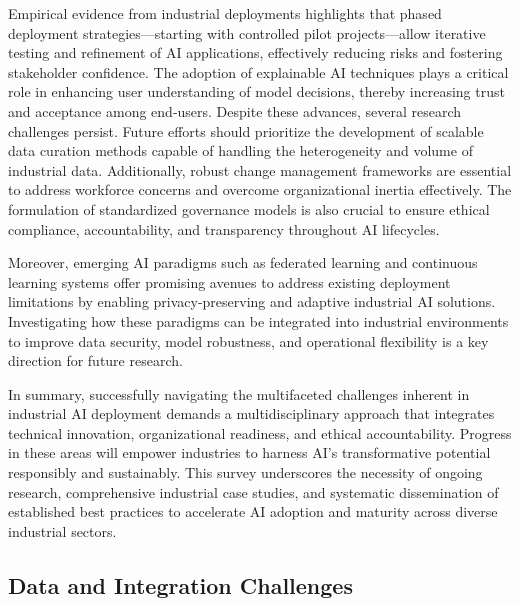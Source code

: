 \documentclass[sigconf]{acmart}
\begin{document}
Empirical evidence from industrial deployments highlights that phased deployment strategies—starting with controlled pilot projects—allow iterative testing and refinement of AI applications, effectively reducing risks and fostering stakeholder confidence. The adoption of explainable AI techniques plays a critical role in enhancing user understanding of model decisions, thereby increasing trust and acceptance among end-users. Despite these advances, several research challenges persist. Future efforts should prioritize the development of scalable data curation methods capable of handling the heterogeneity and volume of industrial data. Additionally, robust change management frameworks are essential to address workforce concerns and overcome organizational inertia effectively. The formulation of standardized governance models is also crucial to ensure ethical compliance, accountability, and transparency throughout AI lifecycles.

Moreover, emerging AI paradigms such as federated learning and continuous learning systems offer promising avenues to address existing deployment limitations by enabling privacy-preserving and adaptive industrial AI solutions. Investigating how these paradigms can be integrated into industrial environments to improve data security, model robustness, and operational flexibility is a key direction for future research.

In summary, successfully navigating the multifaceted challenges inherent in industrial AI deployment demands a multidisciplinary approach that integrates technical innovation, organizational readiness, and ethical accountability. Progress in these areas will empower industries to harness AI's transformative potential responsibly and sustainably. This survey underscores the necessity of ongoing research, comprehensive industrial case studies, and systematic dissemination of established best practices to accelerate AI adoption and maturity across diverse industrial sectors.

\subsection{Data and Integration Challenges}
\end{document}
